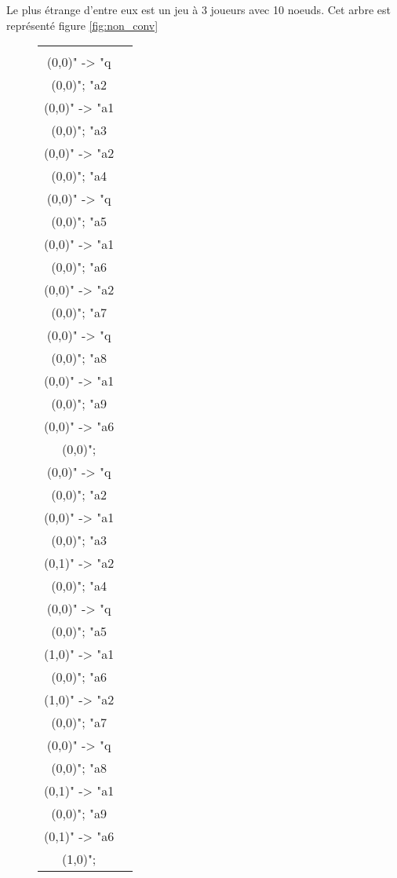\documentclass[12pt]{article}
\theoremstyle{defi}
\theoremstyle{not}
\theoremstyle{prob}
\begin{document}
      Le plus étrange d'entre eux est un jeu à 3 joueurs avec 10 noeuds. Cet arbre est représenté figure \ref{fig:non_conv}

      \begin{figure}
        \centering
        \begin{tabular}{cc}
          \begin{tikzpicture}[>=stealth]
          \graph [ layered layout, nodes = {scale=0.75, align=center} ] {
          "a1\\ (0,0)" -> "q\\ (0,0)";
          "a2\\ (0,0)" -> "a1\\ (0,0)";
          "a3\\ (0,0)" -> "a2\\ (0,0)";
          "a4\\ (0,0)" -> "q\\ (0,0)";
          "a5\\ (0,0)" -> "a1\\ (0,0)";
          "a6\\ (0,0)" -> "a2\\ (0,0)";
          "a7\\ (0,0)" -> "q\\ (0,0)";
          "a8\\ (0,0)" -> "a1\\ (0,0)";
          "a9\\ (0,0)" -> "a6\\ (0,0)";
          };
          \end{tikzpicture} &

          \begin{tikzpicture}[>=stealth]
          \graph [ layered layout, nodes = {scale=0.75, align=center} ] {
          "a1\\ (0,0)" -> "q\\ (0,0)";
          "a2\\ (0,0)" -> "a1\\ (0,0)";
          "a3\\ (0,1)" -> "a2\\ (0,0)";
          "a4\\ (0,0)" -> "q\\ (0,0)";
          "a5\\ (1,0)" -> "a1\\ (0,0)";
          "a6\\ (1,0)" -> "a2\\ (0,0)";
          "a7\\ (0,0)" -> "q\\ (0,0)";
          "a8\\ (0,1)" -> "a1\\ (0,0)";
          "a9\\ (0,1)" -> "a6\\ (1,0)";
          };
          \end{tikzpicture} \\


\end{tabular}
\end{figure}
\end{document}
